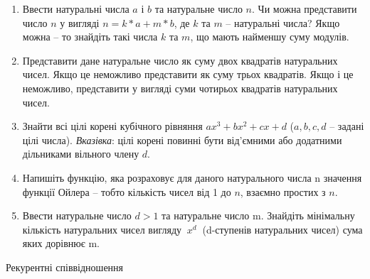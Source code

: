 \documentclass[]{article}
\begin{document}
\begin{enumerate}
\item
  Ввести натуральні числа $a$ і $b$ та натуральне число $n$. Чи можна
  представити число $n$ у вигляді $n= k*a + m*b$, де $k$ та $m$ -- натуральні
  числа? Якщо можна -- то знайдіть такі числа $k$ та $m$, що мають найменшу
  суму модулів.
\item
Представити дане натуральне число як суму двох квадратів натуральних
чисел. Якщо це неможливо представити як суму трьох квадратів. Якщо і це
неможливо, представити у вигляді суми чотирьох квадратів натуральних
чисел.
\item
 Знайти всі цілі корені кубічного рівняння $ax^3 + bx^2 + cx + d$ ($a,b,c,d$ 
-- задані цілі числа). \emph{Вказівка}: цілі корені повинні бути від'ємними
 або додатними дільниками вільного члену $d$.
\item
  Напишіть функцію, яка розраховує для даного натурального числа n
  значення функції Ойлера -- тобто кількість чисел від 1 до $n$, взаємно простих з
  $n$.
\item
Ввести натуральне число \(d > 1\) та натуральне число m. Знайдіть
мінімальну кількість натуральних чисел вигляду \(\ x^{d}\ \) (d-ступенів
натуральних чисел) сума яких дорівнює m.

\end{enumerate}

Рекурентні співвідношення
\end{document}
